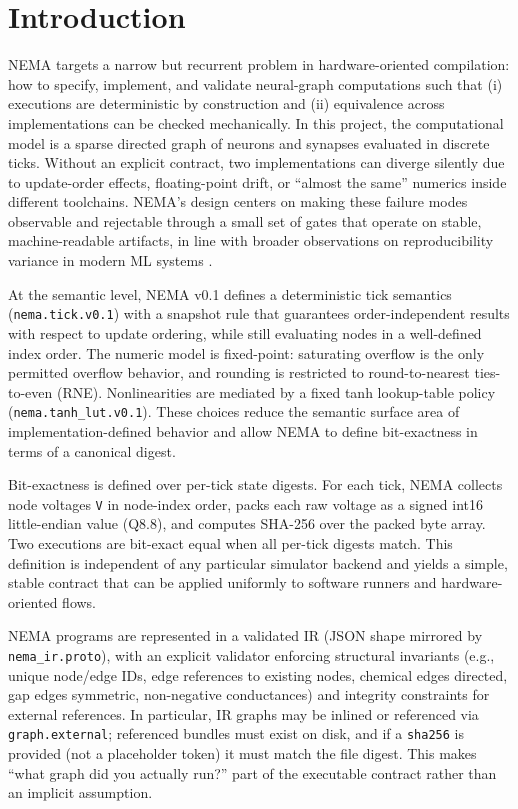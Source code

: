 \section{Introduction}

NEMA targets a narrow but recurrent problem in hardware-oriented compilation: how to specify, implement, and validate neural-graph computations such that (i) executions are deterministic by construction and (ii) equivalence across implementations can be checked mechanically. In this project, the computational model is a sparse directed graph of neurons and synapses evaluated in discrete ticks. Without an explicit contract, two implementations can diverge silently due to update-order effects, floating-point drift, or ``almost the same'' numerics inside different toolchains. NEMA's design centers on making these failure modes observable and rejectable through a small set of gates that operate on stable, machine-readable artifacts, in line with broader observations on reproducibility variance in modern ML systems \cite{PhamASE2020Variance,ChenICSE2022ReproDL,ZhuangArxiv2106.11872,ShanmugaveluArxiv2408.05148}.

At the semantic level, NEMA v0.1 defines a deterministic tick semantics (\texttt{nema.tick.v0.1}) with a snapshot rule that guarantees order-independent results with respect to update ordering, while still evaluating nodes in a well-defined index order. The numeric model is fixed-point: saturating overflow is the only permitted overflow behavior, and rounding is restricted to round-to-nearest ties-to-even (RNE). Nonlinearities are mediated by a fixed tanh lookup-table policy (\texttt{nema.tanh\_lut.v0.1}). These choices reduce the semantic surface area of implementation-defined behavior and allow NEMA to define bit-exactness in terms of a canonical digest.

Bit-exactness is defined over per-tick state digests. For each tick, NEMA collects node voltages \texttt{V} in node-index order, packs each raw voltage as a signed int16 little-endian value (Q8.8), and computes SHA-256 over the packed byte array. Two executions are bit-exact equal when all per-tick digests match. This definition is independent of any particular simulator backend and yields a simple, stable contract that can be applied uniformly to software runners and hardware-oriented flows.

NEMA programs are represented in a validated IR (JSON shape mirrored by \texttt{nema\_ir.proto}), with an explicit validator enforcing structural invariants (e.g., unique node/edge IDs, edge references to existing nodes, chemical edges directed, gap edges symmetric, non-negative conductances) and integrity constraints for external references. In particular, IR graphs may be inlined or referenced via \texttt{graph.external}; referenced bundles must exist on disk, and if a \texttt{sha256} is provided (not a placeholder token) it must match the file digest. This makes ``what graph did you actually run?'' part of the executable contract rather than an implicit assumption.

